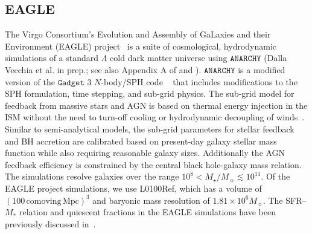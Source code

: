 \documentclass[preprint2,tighten]{aastex62}
\begin{document}
\subsection{EAGLE}
The Virgo Consortium's Evolution and Assembly of GaLaxies and their 
Environment (EAGLE) project~\citep{schaye2015, crain2015} is a suite 
of cosmological, hydrodynamic simulations of a standard 
$\Lambda$ cold dark matter universe using $\mathtt{ANARCHY}$ (Dalla 
Vecchia et al. in prep.; see also Appendix A of \citealt{schaye2015} and 
\citealt{schaller2015}). $\mathtt{ANARCHY}$ is a modified version of 
the $\mathtt{Gadget}$ 3 $N$-body/SPH code ~\citep{springel2005} that
includes modifications to the SPH formulation, time stepping, and sub-grid 
physics. The sub-grid model for feedback from massive stars and AGN is 
based on thermal energy injection in the ISM without the need to turn-off
cooling or hydrodynamic decoupling of winds~\citep{dallavecchia2012}. 
Similar to semi-analytical models, the sub-grid parameters for stellar 
feedback and BH accretion are calibrated based on present-day galaxy 
stellar mass function while also requiring reasonable galaxy sizes.
Additionally the AGN feedback efficiency is constrained by the central 
black hole-galaxy mass relation. The simulations resolve galaxies over 
the range $10^{8} < M_{\star}/M_{\sun} \lesssim 10^{11}$. %
Of the EAGLE project simulations, we use L0100Ref, which has a volume 
of $(100\,\mathrm{comoving\,Mpc})^3$ and baryonic mass resolution of 
$1.81\times 10^6M_{\sun}$. The SFR--$M_*$ relation and quiescent fractions 
in the EAGLE simulations have been previously discussed 
in~\citet{furlong2015, trayford2015, trayford2017}. 
\end{document}
